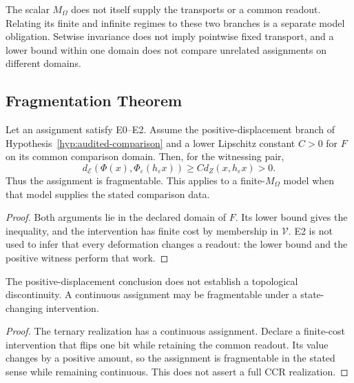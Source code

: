 \begin{remark}
The scalar $M_\Omega$ does not itself supply the transports or a common readout. Relating its finite and infinite regimes to these two branches is a separate model obligation. Setwise invariance does not imply pointwise fixed transport, and a lower bound within one domain does not compare unrelated assignments on different domains.
\end{remark}

\subsection{Fragmentation Theorem}

\begin{theorem}\label{thm:fragmentation}
Let an assignment satisfy E0--E2. Assume the positive-displacement branch of Hypothesis~\ref{hyp:audited-comparison} and a lower Lipschitz constant $C>0$ for $F$ on its common comparison domain. Then, for the witnessing pair,
\[
d_{\mathcal E}(\Phi(x),\Phi_\varepsilon(h_\varepsilon x))\geq C d_Z(x,h_\varepsilon x)>0.
\]
Thus the assignment is fragmentable. This applies to a finite-$M_\Omega$ model when that model supplies the stated comparison data.
\end{theorem}

\begin{proof}
Both arguments lie in the declared domain of $F$. Its lower bound gives the inequality, and the intervention has finite cost by membership in $\mathcal V$. E2 is not used to infer that every deformation changes a readout: the lower bound and the positive witness perform that work.
\end{proof}

\begin{corollary}
The positive-displacement conclusion does not establish a topological discontinuity. A continuous assignment may be fragmentable under a state-changing intervention.
\end{corollary}

\begin{proof}
The ternary realization has a continuous assignment. Declare a finite-cost intervention that flips one bit while retaining the common readout. Its value changes by a positive amount, so the assignment is fragmentable in the stated sense while remaining continuous. This does not assert a full CCR realization.
\end{proof}

